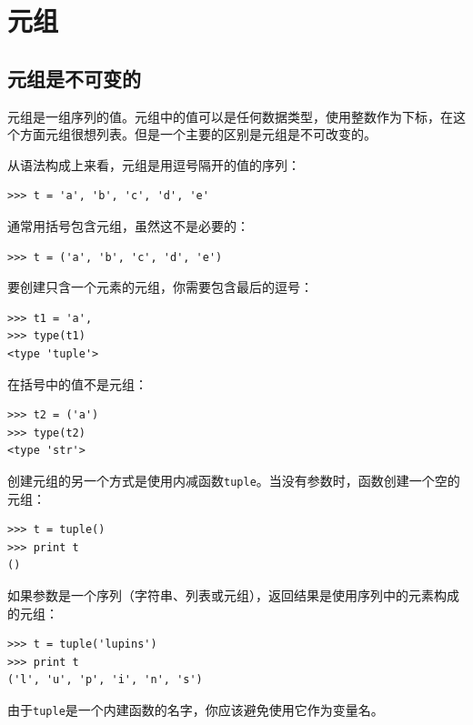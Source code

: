 \chapter{元组}
\label{元组}

\section{元组是不可变的}


元组是一组序列的值。元组中的值可以是任何数据类型，使用整数作为下标，在这个方面元组很想列表。但是一个主要的区别是元组是不可改变的。


从语法构成上来看，元组是用逗号隔开的值的序列：

\beforeverb
\begin{verbatim}
>>> t = 'a', 'b', 'c', 'd', 'e'
\end{verbatim}
\afterverb
%
通常用括号包含元组，虽然这不是必要的：


\beforeverb
\begin{verbatim}
>>> t = ('a', 'b', 'c', 'd', 'e')
\end{verbatim}
\afterverb
%
要创建只含一个元素的元组，你需要包含最后的逗号：


\beforeverb
\begin{verbatim}
>>> t1 = 'a',
>>> type(t1)
<type 'tuple'>
\end{verbatim}
\afterverb
%
在括号中的值不是元组：

\beforeverb
\begin{verbatim}
>>> t2 = ('a')
>>> type(t2)
<type 'str'>
\end{verbatim}
\afterverb
%
创建元组的另一个方式是使用内减函数{\tt tuple}。当没有参数时，函数创建一个空的元组：


\beforeverb
\begin{verbatim}
>>> t = tuple()
>>> print t
()
\end{verbatim}
\afterverb
%
如果参数是一个序列（字符串、列表或元组），返回结果是使用序列中的元素构成的元组：

\beforeverb
\begin{verbatim}
>>> t = tuple('lupins')
>>> print t
('l', 'u', 'p', 'i', 'n', 's')
\end{verbatim}
\afterverb
%
由于{\tt tuple}是一个内建函数的名字，你应该避免使用它作为变量名。

